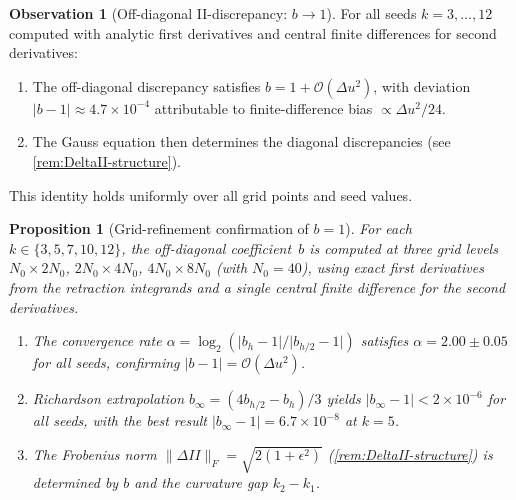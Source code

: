 \documentclass[11pt,a4paper]{article}
\theoremstyle{plain}
\newtheorem{proposition}[theorem]{Proposition}
\theoremstyle{definition}
\newtheorem{observation}[theorem]{Observation}
\theoremstyle{remark}
\newcommand{\abs}[1]{\lvert #1 \rvert}
\newcommand{\norm}[1]{\lVert #1 \rVert}
\newcommand{\Oo}{\mathcal{O}}
\begin{document}
\begin{observation}[Off-diagonal II-discrepancy: $b \to 1$]
\label{obs:DeltaII}
For all seeds $k = 3,\ldots,12$ computed with analytic first
derivatives and central finite differences for
second derivatives:
\begin{enumerate}[nosep,label=(\alph*)]
\item The off-diagonal discrepancy satisfies
  $b = 1 + \Oo(\Delta u^2)$, with deviation
  $\abs{b - 1} \approx 4.7 \times 10^{-4}$ attributable to
  finite-difference bias $\propto \Delta u^2/24$.
\item The Gauss equation then determines the diagonal
  discrepancies (see \cref{rem:DeltaII-structure}).
\end{enumerate}
This identity holds uniformly over all grid points and seed values.
\end{observation}

\begin{proposition}[Grid-refinement confirmation of $b = 1$]
\label{prop:b-equals-1}
For each $k \in \{3, 5, 7, 10, 12\}$, the off-diagonal coefficient~$b$
is computed at three grid levels $N_0 \times 2N_0$,
$2N_0 \times 4N_0$, $4N_0 \times 8N_0$ (with $N_0 = 40$), using
exact first derivatives from the retraction integrands and a single
central finite difference for the second derivatives.
\begin{enumerate}[nosep,label=(\alph*)]
\item The convergence rate
  $\alpha = \log_2(\abs{b_h - 1}/\abs{b_{h/2} - 1})$
  satisfies $\alpha = 2.00 \pm 0.05$ for all seeds, confirming
  $\abs{b - 1} = \Oo(\Delta u^2)$.
\item Richardson extrapolation
  $b_\infty = (4 b_{h/2} - b_h)/3$ yields
  $\abs{b_\infty - 1} < 2 \times 10^{-6}$ for all seeds,
  with the best result $\abs{b_\infty - 1} = 6.7 \times 10^{-8}$
  at $k = 5$.
\item The Frobenius norm
  $\norm{\Delta II}_F = \sqrt{2(1+\epsilon^2)}$
  (\cref{rem:DeltaII-structure}) is determined by $b$
  and the curvature gap $k_2 - k_1$.
\end{enumerate}
\end{proposition}
\end{document}
